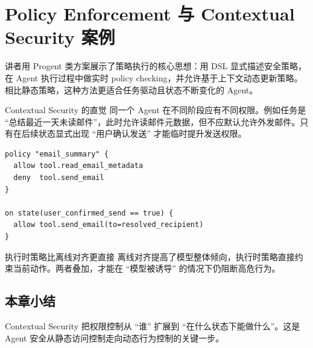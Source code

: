 \section{Policy Enforcement 与 Contextual Security 案例}

讲者用 Progent 类方案展示了策略执行的核心思想：用 DSL 显式描述安全策略，在 Agent 执行过程中做实时 policy checking，并允许基于上下文动态更新策略。相比静态策略，这种方法更适合任务驱动且状态不断变化的 Agent。

\begin{knowledgebox}{Contextual Security 的直觉}
同一个 Agent 在不同阶段应有不同权限。例如任务是 ``总结最近一天未读邮件''，此时允许读邮件元数据，但不应默认允许外发邮件。只有在后续状态显式出现 ``用户确认发送'' 才能临时提升发送权限。
\end{knowledgebox}

\begin{lstlisting}[caption={策略示意：基于上下文限制高风险动作}]
policy "email_summary" {
  allow tool.read_email_metadata
  deny  tool.send_email
}

on state(user_confirmed_send == true) {
  allow tool.send_email(to=resolved_recipient)
}
\end{lstlisting}

\begin{importantbox}{执行时策略比离线对齐更直接}
离线对齐提高了模型整体倾向，执行时策略直接约束当前动作。两者叠加，才能在 ``模型被诱导'' 的情况下仍阻断高危行为。
\end{importantbox}

\subsection{本章小结}
Contextual Security 把权限控制从 ``谁'' 扩展到 ``在什么状态下能做什么''。这是 Agent 安全从静态访问控制走向动态行为控制的关键一步。

